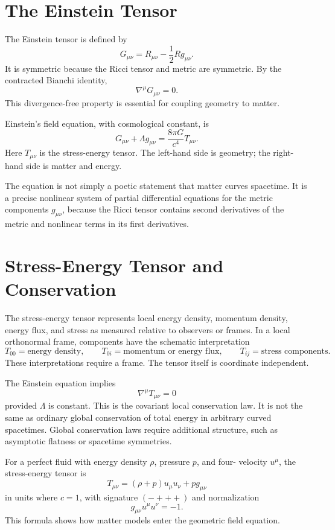 \clearpage

\section{The Einstein Tensor}

The Einstein tensor is defined by
\[
\boxed{
G_{\mu\nu}=R_{\mu\nu}-\frac{1}{2}Rg_{\mu\nu}.
}
\]
It is symmetric because the Ricci tensor and metric are symmetric. By the
contracted Bianchi identity,
\[
\nabla^\mu G_{\mu\nu}=0.
\]
This divergence-free property is essential for coupling geometry to matter.

Einstein's field equation, with cosmological constant, is
\[
\boxed{
G_{\mu\nu}+\Lambda g_{\mu\nu}
=\frac{8\pi G}{c^4}T_{\mu\nu}.
}
\]
Here \(T_{\mu\nu}\) is the stress-energy tensor. The left-hand side is geometry;
the right-hand side is matter and energy.

The equation is not simply a poetic statement that matter curves spacetime. It
is a precise nonlinear system of partial differential equations for the metric
components \(g_{\mu\nu}\), because the Ricci tensor contains second derivatives
of the metric and nonlinear terms in its first derivatives.

\clearpage

\section{Stress-Energy Tensor and Conservation}

The stress-energy tensor represents local energy density, momentum density,
energy flux, and stress as measured relative to observers or frames. In a local
orthonormal frame, components have the schematic interpretation
\[
T_{00}=\text{energy density},
\qquad
T_{0i}=\text{momentum or energy flux},
\qquad
T_{ij}=\text{stress components}.
\]
These interpretations require a frame. The tensor itself is coordinate
independent.

The Einstein equation implies
\[
\nabla^\mu T_{\mu\nu}=0
\]
provided \(\Lambda\) is constant. This is the covariant local conservation law.
It is not the same as ordinary global conservation of total energy in arbitrary
curved spacetimes. Global conservation laws require additional structure, such
as asymptotic flatness or spacetime symmetries.

For a perfect fluid with energy density \(\rho\), pressure \(p\), and four-
velocity \(u^\mu\), the stress-energy tensor is
\[
T_{\mu\nu}=(\rho+p)u_\mu u_\nu+p g_{\mu\nu}
\]
in units where \(c=1\), with signature \((-+++)\) and normalization
\[
g_{\mu\nu}u^\mu u^\nu=-1.
\]
This formula shows how matter models enter the geometric field equation.

